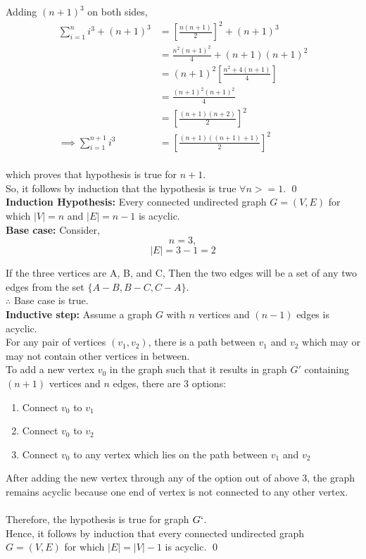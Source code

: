 \documentclass[12pt,twoside]{article}
\begin{document}
\begin{problems}
Adding $(n+1)^3$ on both sides,
\begin{align*}
    \sum_{i=1}^{n} i^3 + (n+1)^3 &= \left[\frac{n(n+1)}{2}\right]^2 + (n+1)^3 \\
    &= \frac{n^2(n+1)^2}{4} + (n+1)(n+1)^2 \\
    &= (n+1)^2 \left[\frac{n^2 + 4(n+1)}{4}\right] \\
    &= \frac{(n+1)^2 (n+1)^2}{4} \\
    &= \left[\frac{(n+1)(n+2)}{2}\right]^2 \\
    \implies \sum_{i=1}^{n+1} i^3 &= \left[\frac{(n+1)((n+1)+1)}{2}\right]^2
\end{align*}
\\
which proves that hypothesis is true for $n+1$. \\
So, it follows by induction that the hypothesis is true $\forall n >= 1$. \qed
\newpage
\problem  %
\\ 
{\bf Induction Hypothesis: } Every connected undirected graph $G = (V, E)$ for which $|V| = n$ and $|E| = n-1$ is acyclic. \\

{\bf Base case: } Consider, 
\[n = 3,\] 
\[|E| = 3-1 = 2\]

If the three vertices are A, B, and C, Then the two edges will be a set of any two edges from the set $\{A-B, B-C, C-A\}$. \\
$\therefore$ Base case is true.
\\

{\bf Inductive step: } Assume a graph $G$ with $n$ vertices and $(n-1)$ edges is acyclic. \\

For any pair of vertices $(v_1, v_2)$, there is a path between $v_1$ and $v_2$ which may or may not contain other vertices in between. \\

To add a new vertex $v_0$ in the graph such that it results in graph $G'$ containing $(n+1)$ vertices and $n$ edges, there are 3 options:
\begin{enumerate}
    \item Connect $v_0$ to $v_1$
    \item Connect $v_0$ to $v_2$
    \item Connect $v_0$ to any vertex which lies on the path between $v_1$ and $v_2$
\end{enumerate}

After adding the new vertex through any of the option out of above 3, the graph remains acyclic because one end of vertex is not connected to any other vertex. \\ \\
Therefore, the hypothesis is true for graph $G`$. \\
Hence, it follows by induction that every connected undirected graph $G = (V, E)$ for which $|E| = |V| - 1$ is acyclic. \qed 


\end{problems}
\end{document}
